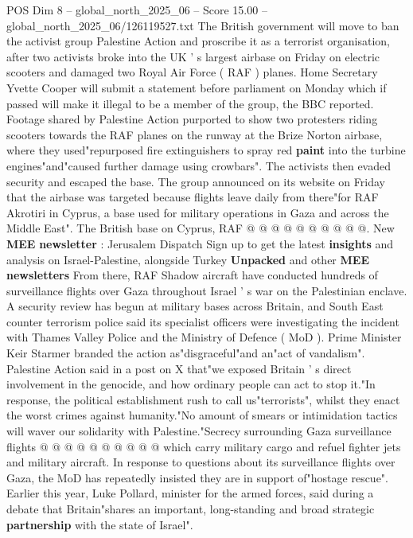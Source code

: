 \begin{textsample}{POS Dim 8 – global\_north\_2025\_06 – Score 15.00 – global\_north\_2025\_06/126119527.txt}  \label{ex:f8_pos_041}
The British government will move to ban the activist group Palestine Action and proscribe it as a terrorist organisation, after two activists broke into the UK ' s largest airbase on Friday on electric scooters and damaged two Royal Air Force ( RAF ) planes.
Home Secretary Yvette Cooper will submit a statement before parliament on Monday which if passed will make it illegal to be a member of the group, the BBC reported.
Footage shared by Palestine Action purported to show two protesters riding scooters towards the RAF planes on the runway at the Brize Norton airbase, where they used"repurposed fire extinguishers to spray red \textbf{paint} into the turbine engines"and"caused further damage using crowbars".
The activists then evaded security and escaped the base.
The group announced on its website on Friday that the airbase was targeted because flights leave daily from there"for RAF Akrotiri in Cyprus, a base used for military operations in Gaza and across the Middle East".
The British base on Cyprus, RAF @ @ @ @ @ @ @ @ @ @.
New \textbf{MEE} \textbf{newsletter} : Jerusalem Dispatch Sign up to get the latest \textbf{insights} and analysis on Israel-Palestine, alongside Turkey \textbf{Unpacked} and other \textbf{MEE} \textbf{newsletters} From there, RAF Shadow aircraft have conducted hundreds of surveillance flights over Gaza throughout Israel ' s war on the Palestinian enclave.
A security review has begun at military bases across Britain, and South East counter terrorism police said its specialist officers were investigating the incident with Thames Valley Police and the Ministry of Defence ( MoD ).
Prime Minister Keir Starmer branded the action as"disgraceful"and an"act of vandalism".
Palestine Action said in a post on X that"we exposed Britain ' s direct involvement in the genocide, and how ordinary people can act to stop it."In response, the political establishment rush to call us"terrorists", whilst they enact the worst crimes against humanity."No amount of smears or intimidation tactics will waver our solidarity with Palestine."Secrecy surrounding Gaza surveillance flights @ @ @ @ @ @ @ @ @ @ which carry military cargo and refuel fighter jets and military aircraft.
In response to questions about its surveillance flights over Gaza, the MoD has repeatedly insisted they are in support of"hostage rescue".
Earlier this year, Luke Pollard, minister for the armed forces, said during a debate that Britain"shares an important, long-standing and broad strategic \textbf{partnership} with the state of Israel".

\end{textsample}
